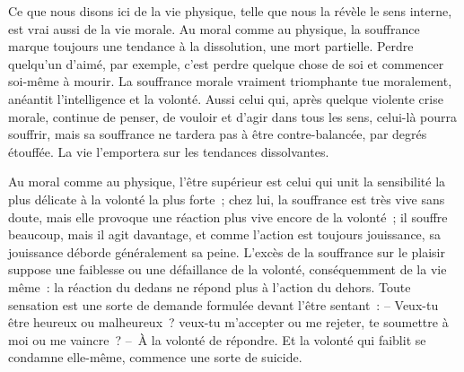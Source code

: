 \documentclass[french,twoside]{book} %
\begin{document}
Ce que nous disons ici de la vie physique, telle que nous la révèle le sens interne, est vrai aussi de la vie morale. Au moral comme au physique, la souffrance marque toujours une tendance à la dissolution, une mort partielle. Perdre quelqu’un d’aimé, par exemple, c’est perdre quelque chose de soi et commencer soi-même à mourir. La souffrance morale vraiment triomphante tue moralement, anéantit l’intelligence et la volonté. Aussi celui qui, après quelque violente crise morale, continue de penser, de vouloir et d’agir dans tous les sens, celui-là pourra souffrir, mais sa souffrance ne tardera pas à être contre-balancée, par degrés étouffée. La vie l’emportera sur les tendances dissolvantes.\par
Au moral comme au physique, l’être supérieur est celui qui unit la sensibilité la plus délicate à la volonté la plus forte ; chez lui, la souffrance est très vive sans doute, mais elle provoque une réaction plus vive encore de la volonté ; il souffre beaucoup, mais il agit davantage, et comme l’action est toujours jouissance, sa jouissance déborde généralement sa peine. L’excès de la souffrance sur le plaisir suppose une faiblesse ou une défaillance de la volonté, conséquemment de la vie même : la réaction du dedans ne répond plus à l’action du dehors. Toute sensation est une sorte de demande formulée devant l’être sentant : – Veux-tu être heureux ou malheureux ? veux-tu m’accepter ou me rejeter, te soumettre à moi ou me vaincre ? – À la volonté de répondre. Et la volonté qui faiblit se condamne elle-même, commence une sorte de suicide.\par
\end{document}
